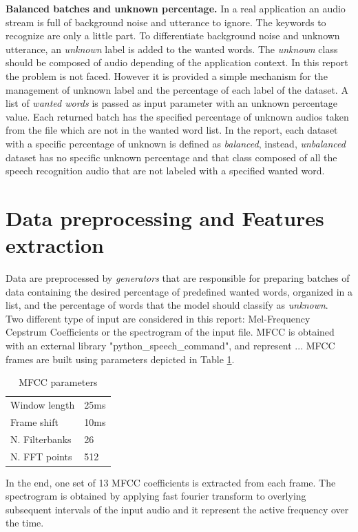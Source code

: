 \textbf{Balanced batches and unknown percentage.} In a real application an audio stream is full of background noise and utterance to ignore. The keywords to recognize are only a little part. To differentiate background noise and unknown utterance, an \textit{unknown} label is added to the wanted words. The \textit{unknown} class should be composed of audio depending of the application context. In this report the problem is not faced. However it is provided a simple mechanism for the management of unknown label and the percentage of each label of the dataset. A list of \textit{wanted words} is passed as input parameter with an unknown percentage value. Each returned batch has the specified percentage of unknown audios taken from the file which are not in the wanted word list. In the report, each dataset with a specific percentage of unknown is defined as \textit{balanced}, instead, \textit{unbalanced} dataset has no specific unknown percentage and that class composed of all the speech recognition audio that are not labeled with a specified wanted word.


\section{Data preprocessing and Features extraction}
\label{sec:model}

\noindent Data are preprocessed by \textit{generators} that are responsible for preparing batches of data containing the desired percentage of predefined wanted words, organized in a list, and the percentage of words that the model should classify as \textit{unknown}. \\
Two different type of input are considered in this report: Mel-Frequency Cepstrum Coefficients or the spectrogram of the input file. MFCC is obtained with an external library "python\_speech\_command", and represent ...  MFCC frames are built using parameters depicted in Table \ref{table:mfcc_parameters}.
\begin{table}[h!]
	\centering
	\begin{tabular}{ p{3cm}|p{3cm}|}
		\hline
		Window length & 25ms \\
		Frame shift  & 10ms  \\
		N. Filterbanks & 26\\
		N. FFT points & 512\\
		\hline
	\end{tabular}
	\caption{MFCC parameters}
	\label{table:mfcc_parameters}
\end{table}
\noindent In the end, one set of 13 MFCC coefficients is extracted from each frame. 
The spectrogram is obtained by applying fast fourier transform to overlying subsequent intervals of the input audio and it represent the active frequency over the time.


